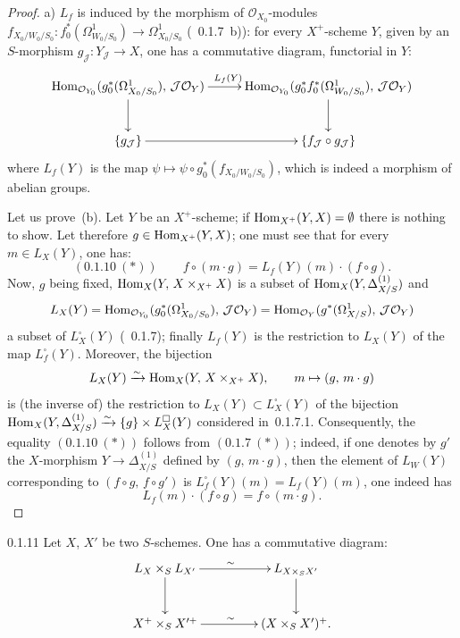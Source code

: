 \begin{proof}
a) \(L_{f}\) is induced by the morphism of
\(\mathcal{O}_{X_{0}}\)-modules
\(f_{X_{0}/W_{0}/S_{0}}\colon
f_{0}^{*}(\Omega^{1}_{W_{0}/S_{0}})\to\Omega^{1}_{X_{0}/S_{0}}\)
(\cf~0.1.7~b)): for every \(X^{+}\)-scheme \(Y\), given by an \(S\)-morphism
\(g_{\mathcal{J}}\colon Y_{\mathcal{J}}\to X\), one has a commutative
diagram, functorial in \(Y\):
\[
\xymatrix@C=2.6em@R=2.6em{
\Hom_{\mathcal{O}_{Y_{0}}}(g_{0}^{*}(\Omega^{1}_{X_{0}/S_{0}}),\,\mathcal{J}\mathcal{O}_{Y})
  \ar[r]^{L_{f}(Y)}
  \ar[d]
& \Hom_{\mathcal{O}_{Y_{0}}}(g_{0}^{*}f_{0}^{*}(\Omega^{1}_{W_{0}/S_{0}}),\,\mathcal{J}\mathcal{O}_{Y})
  \ar[d]
\\
\{g_{\mathcal{J}}\}
  \ar[r]
& \{f_{\mathcal{J}}\circ g_{\mathcal{J}}\}
}
\]
where \(L_{f}(Y)\) is the map
\(\psi\mapsto\psi\circ g_{0}^{*}(f_{X_{0}/W_{0}/S_{0}})\), which is indeed a
morphism of abelian groups.%
{\renewcommand{\thefootnote}{(17)}}

Let us prove~(b). Let \(Y\) be an \(X^{+}\)-scheme; if
\(\operatorname{Hom}_{X^{+}}(Y,X)=\emptyset\) there is nothing to show. Let therefore
\(g\in\operatorname{Hom}_{X^{+}}(Y,X)\); one must see that for every
\(m\in L_{X}(Y)\), one has:
\[
(0.1.10\ (*))\qquad f\circ(m\cdot g)=L_{f}(Y)(m)\cdot(f\circ g).
\]
Now, \(g\) being fixed, \(\operatorname{Hom}_{X}(Y,\,X\times_{X^{+}}X)\) is a subset of
\(\operatorname{Hom}_{X}(Y,\Delta^{(1)}_{X/S})\) and
\[
L_{X}(Y)
=\operatorname{Hom}_{\mathcal{O}_{Y_{0}}}(g_{0}^{*}(\Omega^{1}_{X_{0}/S_{0}}),\,\mathcal{J}\mathcal{O}_{Y})
=\operatorname{Hom}_{\mathcal{O}_{Y}}(g^{*}(\Omega^{1}_{X/S}),\,\mathcal{J}\mathcal{O}_{Y})
\]
a subset of \(L^{\square}_{X}(Y)\) (\cf~0.1.7); finally
\(L_{f}(Y)\) is the restriction to \(L_{X}(Y)\) of the map
\(L^{\square}_{f}(Y)\). Moreover, the bijection
\[
L_{X}(Y)\xrightarrow{\sim}\operatorname{Hom}_{X}(Y,\,X\times_{X^{+}}X),
\qquad m\mapsto(g,\,m\cdot g)
\]
is (the inverse of) the restriction to
\(L_{X}(Y)\subset L^{\square}_{X}(Y)\) of the bijection
\(\operatorname{Hom}_{X}(Y,\Delta^{(1)}_{X/S})\xrightarrow{\sim}
\{g\}\times L^{\square}_{X}(Y)\) considered in~0.1.7.1.
Consequently, the equality \((0.1.10\ (*))\) follows from
\((0.1.7\ (*))\); indeed, if one denotes by \(g'\) the \(X\)-morphism
\(Y\to\Delta^{(1)}_{X/S}\) defined by \((g,\,m\cdot g)\), then the element
of \(L_{W}(Y)\) corresponding to \((f\circ g,\,f\circ g')\) is
\(L^{\square}_{f}(Y)(m)=L_{f}(Y)(m)\), \ie one indeed has
\[
L_{f}(m)\cdot(f\circ g)=f\circ(m\cdot g).
\]
\end{proof}

\begin{lemma}{0.1.11}
\label{III.0.1.11}
Let \(X\), \(X'\) be two \(S\)-schemes. One has a commutative diagram:
\[
\xymatrix@C=4.5em@R=2.8em{
L_{X}\times_{S}L_{X'}
  \ar[r]^{\sim}
  \ar[d]
& L_{X\times_{S}X'}
  \ar[d]
\\
X^{+}\times_{S}X'^{+}
  \ar[r]^{\sim}
& (X\times_{S}X')^{+}.
}
\]
\end{lemma}

